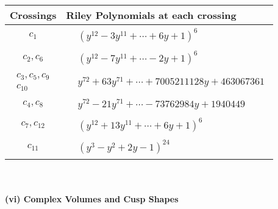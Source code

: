 \documentclass[1p]{elsarticle_modified}
\theoremstyle{definition}
\begin{document}
\begin{tabular}{m{50pt}|m{274pt}}
Crossings & \hspace{64pt}Riley Polynomials at each crossing \\
\hline $$\begin{aligned}c_{1}\end{aligned}$$&$\begin{aligned}
&(y^{12}-3 y^{11}+\cdots+6 y+1)^{6}
\end{aligned}$\\
\hline $$\begin{aligned}c_{2},c_{6}\end{aligned}$$&$\begin{aligned}
&(y^{12}-7 y^{11}+\cdots-2 y+1)^{6}
\end{aligned}$\\
\hline $$\begin{aligned}c_{3},c_{5},c_{9}\\c_{10}\end{aligned}$$&$\begin{aligned}
&y^{72}+63 y^{71}+\cdots+7005211128 y+463067361
\end{aligned}$\\
\hline $$\begin{aligned}c_{4},c_{8}\end{aligned}$$&$\begin{aligned}
&y^{72}-21 y^{71}+\cdots-73762984 y+1940449
\end{aligned}$\\
\hline $$\begin{aligned}c_{7},c_{12}\end{aligned}$$&$\begin{aligned}
&(y^{12}+13 y^{11}+\cdots+6 y+1)^{6}
\end{aligned}$\\
\hline $$\begin{aligned}c_{11}\end{aligned}$$&$\begin{aligned}
&(y^3- y^2+2 y-1)^{24}
\end{aligned}$\\
\hline
\end{tabular}\\~\\
\newpage\flushleft \textbf{(vi) Complex Volumes and Cusp Shapes}
\end{document}
